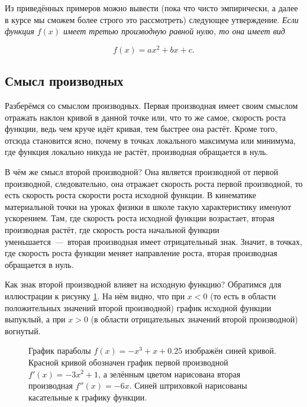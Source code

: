 \documentclass[12pt]{article}
\begin{document}
Из приведённых примеров можно вывести (пока что чисто эмпирически, а далее в курсе мы сможем более строго это рассмотреть) следующее утверждение. \emph{Если функция $f(x)$ имеет третью производную равной нулю, то она имеет вид} 

\begin{equation}
	f(x)=ax^2+bx+c.
\end{equation}

\subsection{Смысл производных}
Разберёмся со смыслом производных. Первая производная имеет своим смыслом отражать наклон кривой в данной точке или, что то же самое, скорость роста функции, ведь чем круче идёт кривая, тем быстрее она растёт. Кроме того, отсюда становится ясно, почему в точках локального максимума или минимума, где функция локально никуда не растёт, производная обращается в нуль. 

\par В чём же смысл второй производной? Она является производной от первой производной, следовательно, она отражает скорость роста первой производной, то есть скорость роста скорости роста исходной функции. В кинематике материальной точки на уроках физики в школе такую характеристику именуют ускорением. Там, где скорость роста исходной функции возрастает, вторая производная растёт, где скорость роста начальной функции уменьшается~\----~вторая производная имеет отрицательный знак. Значит, в точках, где скорость роста функции меняет направление роста, вторая производная обращается в нуль.

\par Как знак второй производной влияет на исходную функцию? Обратимся для иллюстрации к рисунку \ref{fig:71}. На нём видно, что при $x<0$ (то есть в области положительных значений второй производной) график исходной функции выпуклый, а при $x>0$ (в области отрицательных значений второй производной) вогнутый.

\begin{figure}[htbp]
\centering
{}
\caption{График параболы $f(x) = -x^3 + x + 0.25$ изображён синей кривой. Красной кривой обозначен график первой производной $f'(x) = -3x^2+1$, а зелённым цветом нарисована вторая производная $f''(x) = -6x$. Синей штриховкой нарисованы касательные к графику функции.}
\label{fig:71}
\end{figure}
\end{document}
